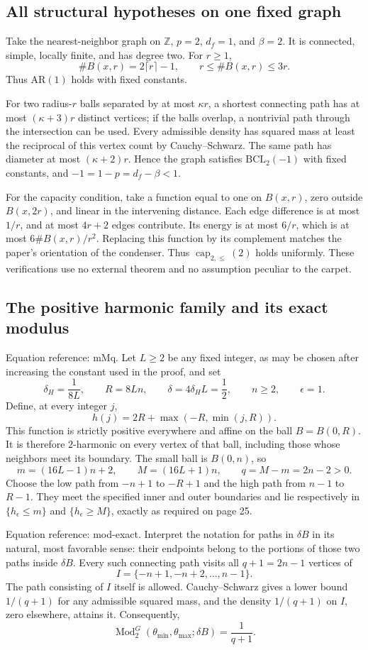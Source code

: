 \documentclass[10pt]{article}
\begin{document}
\subsection*{All structural hypotheses on one fixed graph}
Take the nearest-neighbor graph on \(\mathbb Z\), \(p=2\), \(d_f=1\), and \(\beta=2\). It is connected, simple, locally finite, and has degree two. For \(r\ge1\), \[\#B(x,r)=2\lceil r\rceil-1,\qquad
 r\le \#B(x,r)\le3r.\] Thus \(\mathrm{AR}(1)\) holds with fixed constants.\par
For two radius-\(r\) balls separated by at most \(\kappa r\), a shortest connecting path has at most \((\kappa+3)r\) distinct vertices; if the balls overlap, a nontrivial path through the intersection can be used. Every admissible density has squared mass at least the reciprocal of this vertex count by Cauchy–Schwarz. The same path has diameter at most \((\kappa+2)r\). Hence the graph satisfies \(\mathrm{BCL}_2(-1)\) with fixed constants, and \(-1=1-p=d_f-\beta<1\).\par
For the capacity condition, take a function equal to one on \(B(x,r)\), zero outside \(B(x,2r)\), and linear in the intervening distance. Each edge difference is at most \(1/r\), and at most \(4r+2\) edges contribute. Its energy is at most \(6/r\), which is at most \(6\#B(x,r)/r^2\). Replacing this function by its complement matches the paper’s orientation of the condenser. Thus \(\operatorname{cap}_{2,\le}(2)\) holds uniformly. These verifications use no external theorem and no assumption peculiar to the carpet.\par
\subsection*{The positive harmonic family and its exact modulus}
Equation reference: mMq. Let \(L\ge2\) be any fixed integer, as may be chosen after increasing the constant used in the proof, and set \[\delta_H=\frac1{8L},\qquad R=8Ln,\qquad
 \delta=4\delta_HL=\frac12,\qquad n\ge2,\qquad \epsilon=1.\] Define, at every integer \(j\), \[h(j)=2R+\max(-R,\min(j,R)).\] This function is strictly positive everywhere and affine on the ball \(B=B(0,R)\). It is therefore \(2\)-harmonic on every vertex of that ball, including those whose neighbors meet its boundary. The small ball is \(B(0,n)\), so \[
 m=(16L-1)n+2,\qquad M=(16L+1)n,\qquad q=M-m=2n-2>0.\] Choose the low path from \(-n+1\) to \(-R+1\) and the high path from \(n-1\) to \(R-1\). They meet the specified inner and outer boundaries and lie respectively in \(\{h_\epsilon\le m\}\) and \(\{h_\epsilon\ge M\}\), exactly as required on page 25.\par
Equation reference: mod-exact. Interpret the notation for paths in \(\delta B\) in its natural, most favorable sense: their endpoints belong to the portions of those two paths inside \(\delta B\). Every such connecting path visits all \(q+1=2n-1\) vertices of \[I=\{-n+1,-n+2,\ldots,n-1\}.\] The path consisting of \(I\) itself is allowed. Cauchy–Schwarz gives a lower bound \(1/(q+1)\) for any admissible squared mass, and the density \(1/(q+1)\) on \(I\), zero elsewhere, attains it. Consequently, \[
 \operatorname{Mod}_2^G(\theta_{\min},\theta_{\max};\delta B)=\frac1{q+1}.\]\par
\end{document}
